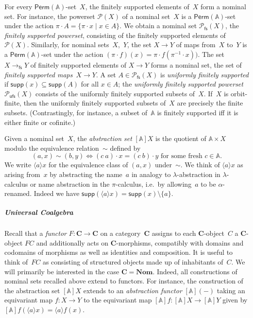 \documentclass[a4paper,UKenglish,cleveref,thm-restate,numberwithinsect,final]{lipics-v2021}
\newcommand{\Perm}{\mathsf{Perm}(\Names)}
\newcommand{\fs}{\mathsf{fs}}
\newcommand{\Names}{\mathbb{A}}
\newcommand{\powufs}{\pow_{\mathsf{ufs}}}
\newcommand{\pow}{\mathcal{P}}
\newcommand{\powfs}{\pow_{\fs}}
\newcommand{\supp}{\mathsf{supp}}
\newcommand{\bind}[1]{\langle #1\rangle}
\theoremstyle{plain}
\numberwithin{equation}{section}
\newcommand{\+}[1]{\mathcal{#1}\xspace}
\newcommand{\Nom}{\mathbf{Nom}}
\newcommand{\BC}{\mathbf{C}}
\newcommand{\names}{\mathbb{A}}
\theoremstyle{definition}
\begin{document}
For every $\Perm$-set~$X$, the finitely supported elements of~$X$ form
a nominal set. For instance, the powerset $\pow(X)$ of a nominal
set~$X$ is a $\Perm$-set under the action
$\pi\cdot A=\{\pi\cdot x\mid x\in A\}$. We obtain a nominal set
$\powfs(X)$, the \emph{finitely supported powerset}, consisting of the
finitely supported elements of~$\pow(X)$. Similarly, for nominal
sets~$X$,~$Y$, the set $X\to Y$ of maps from~$X$ to~$Y$ is a
$\Perm$-set under the action
$(\pi\cdot f)(x)=\pi\cdot f(\pi^{-1}\cdot x))$. The set $X\to_\fs Y$
of finitely supported elements of $X\to Y$ forms a nominal set, the
set of \emph{finitely supported maps}~$X\to Y$. A set $A\in\powfs(X)$
is \emph{uniformly finitely supported} if $\supp(x)\subseteq\supp(A)$
for all $x\in A$; the \emph{uniformly finitely supported powerset}
$\powufs(X)$ consists of the uniformly finitely supported subsets
of~$X$. If~$X$ is orbit-finite, then the uniformly finitely supported
subsets of~$X$ are precisely the finite subsets. (Contrastingly, for
instance, a subset of~$\names$ is finitely supported iff it is either
finite or cofinite.)

Given a nominal set~$X$, the \emph{abstraction set} $[\Names]X$ is the
quotient of $\Names\times X$ modulo the equivalence relation~$\sim$
defined by
\begin{equation*}
  (a,x)\sim(b,y)\iff (c\ a)\cdot x=(c\ b)\cdot y\text{ for some fresh~$c\in\Names$}.
\end{equation*}
We write $\bind{a}x$ for the equivalence class of $(a,x)$
under~$\sim$. We think of $\bind{a}x$ as arising from~$x$ by
abstracting the name~$a$ in analogy to $\lambda$-abstraction in
$\lambda$-calculus or name abstraction in the $\pi$-calculus, i.e.~by
allowing~$a$ to be $\alpha$-renamed. Indeed we have
$\supp(\bind{a}x)=\supp(x)\setminus\{a\}$.







\subparagraph*{Universal Coalgebra} Recall that a \emph{functor}
$F\colon \BC\to\BC$ on a category~$\BC$ assigns to each
$\BC$-object~$C$ a $\BC$-object $FC$ and additionally acts on
$\BC$-morphisms, compatibly with domains and codomains of morphisms as
well as identities and composition. It is useful to think of~$FC$ as
consisting of structured objects made up of inhabitants of~$C$. We
will primarily be interested in the case $\BC=\Nom$. Indeed, all
constructions of nominal sets recalled above extend to functors. For
instance, the construction of the abstraction set $[\Names]X$ extends
to an \emph{abstraction functor} $[\Names](-)$ taking an equivariant
map $f\colon X\to Y$ to the equivariant map
$[\Names]f \colon [\Names]X\to [\Names]Y$ given by
$[\Names]f(\bind{a}x)=\bind{a}f(x)$.
\end{document}
